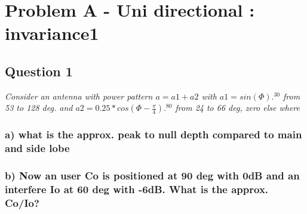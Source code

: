 \section{Problem A - Uni directional : invariance1} \label{sec:mm4_PbA}

\subsection{Question 1}
\textit{Consider an antenna with power pattern $a=a1+a2$ with $a1=sin(\Phi).^{30}$ from 53 to 128 deg. and $a2=0.25*cos(\Phi - \frac{\pi}{4}).^{80}$ from 24 to 66 deg, zero else where}

\subsubsection{a) what is the approx. peak to null depth compared to main and side lobe}


\subsubsection{b) Now an user Co is positioned at 90 deg with 0dB and an interfere Io at 60 deg with -6dB. What is the approx. Co/Io?}


